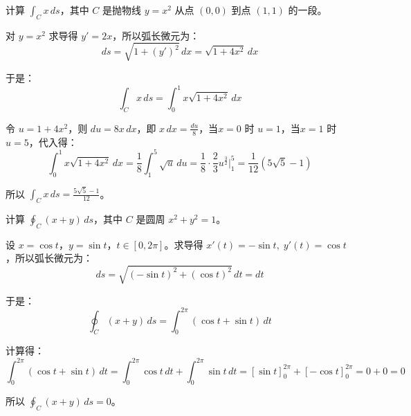 \begin{myexample}
计算 \(\int_C x\,ds\)，其中 \(C\) 是抛物线 \(y = x^2\) 从点 \((0,0)\) 到点 \((1,1)\) 的一段。

对 \(y = x^2\) 求导得 \(y' = 2x\)，所以弧长微元为：
\[
ds = \sqrt{1 + (y')^2}\,dx = \sqrt{1 + 4x^2}\,dx
\]

于是：
\[
\int_C x\,ds = \int_0^1 x\sqrt{1+4x^2}\,dx
\]

令 \(u = 1+4x^2\)，则 \(du = 8x\,dx\)，即 \(x\,dx = \frac{du}{8}\)，当\(x=0\) 时 \(u=1\)，当\(x=1\) 时 \(u=5\)，代入得：
\[
\int_0^1 x\sqrt{1+4x^2}\,dx = \frac18 \int_1^5 \sqrt{u}\,du = \frac18 \cdot \frac23 u^{\frac{3}{2}}\Big|_1^5 = \frac{1}{12}(5\sqrt{5}-1)
\]

所以 \(\int_C x\,ds = \frac{5\sqrt{5}-1}{12}\)。
\end{myexample}

\begin{myexample}
    计算 \(\oint_C (x+y)\,ds\)，其中 \(C\) 是圆周 \(x^2+y^2=1\)。

设 \(x = \cos t\)，\(y = \sin t\)，\(t \in [0,2\pi]\)。求导得 \(x'(t) = -\sin t,\; y'(t) = \cos t\)，所以弧长微元为：
\[
ds = \sqrt{(-\sin t)^2 + (\cos t)^2}\,dt = dt
\]

于是：
\[
\oint_C (x+y)\,ds = \int_0^{2\pi} (\cos t + \sin t)\,dt
\]

计算得：
\[
 \int_0^{2\pi} (\cos t + \sin t)\,dt = \int_0^{2\pi} \cos t\,dt + \int_0^{2\pi} \sin t\,dt = [\sin t]_{0}^{2\pi} + [-\cos t]_{0}^{2\pi} = 0 + 0 = 0
\]

所以 \(\oint_C (x+y)\,ds = 0\)。

\end{myexample}

